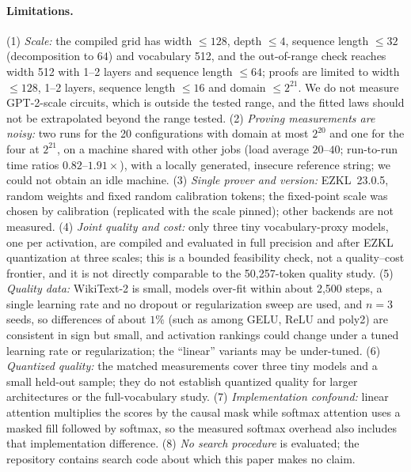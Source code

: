 \documentclass[10pt]{article}
\begin{document}
\paragraph{Limitations.}
\begingroup\sloppy
(1) \emph{Scale:} the compiled grid has width $\le128$, depth $\le4$, sequence
length $\le32$ (decomposition to $64$) and vocabulary 512, and the out-of-range
check reaches width 512 with 1--2 layers and sequence length $\le64$; proofs are limited to
width $\le128$, 1--2 layers, sequence length $\le16$ and domain $\le2^{21}$. We do
not measure GPT-2-scale circuits, which is outside the tested range, and the fitted laws should not be extrapolated beyond the range tested.
(2) \emph{Proving measurements are noisy:} two runs for the 20 configurations with domain at most
$2^{20}$ and one for the four at $2^{21}$, on a machine shared with other jobs
(load average $20$--$40$; run-to-run time ratios $0.82$--$1.91\times$), with a locally
generated, insecure reference string; we could not obtain an idle machine.
(3) \emph{Single prover and version:}
EZKL~23.0.5, random weights and fixed random calibration tokens; the fixed-point
scale was chosen by calibration (replicated with the scale pinned); other
backends are not measured. (4) \emph{Joint quality and cost:} only three tiny
vocabulary-proxy models, one per activation, are compiled and evaluated in full
precision and after EZKL quantization at three scales; this is a bounded
feasibility check, not a quality--cost frontier, and it is not directly
comparable to the 50,257-token quality study.
(5) \emph{Quality data:} WikiText-2 is small, models over-fit within about 2{,}500
steps, a single learning rate and no dropout or regularization sweep are used, and
$n{=}3$ seeds, so differences of about $1\%$ (such as among GELU, ReLU and poly2)
are consistent in sign but small, and activation rankings could change under a
tuned learning rate or regularization; the ``linear'' variants may be under-tuned.
(6) \emph{Quantized quality:} the matched measurements cover three tiny models
and a small held-out sample; they do not establish quantized quality for larger
architectures or the full-vocabulary study.
(7) \emph{Implementation confound:} linear attention multiplies the scores by the
causal mask while softmax attention uses a masked fill followed by softmax, so
the measured softmax overhead also includes that implementation difference. (8) \emph{No search
procedure} is evaluated; the repository contains search code about which this
paper makes no claim.
\endgroup
\end{document}
